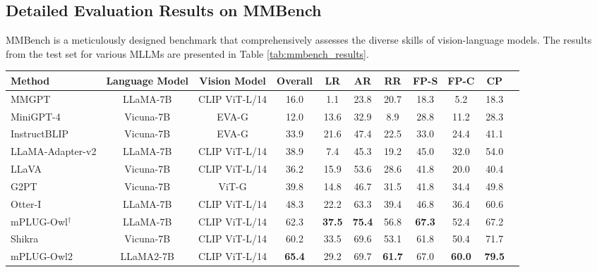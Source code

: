 \documentclass[10pt,twocolumn,letterpaper]{article}
\newcommand{\modelname}{mPLUG-Owl2\xspace}
\begin{document}
\subsection{Detailed Evaluation Results on MMBench}
MMBench \cite{liu2023mmbench} is a meticulously designed benchmark that comprehensively assesses the diverse skills of vision-language models. The results from the test set for various MLLMs are presented in Table \ref{tab:mmbench_results}.


\begin{table*}[!t]
\small
\centering
\begin{tabular}{l|cc|cccccccc}
\toprule
Method & Language Model & Vision Model & Overall & LR & AR & RR & FP-S & FP-C & CP \\
\midrule
MMGPT \cite{gong2023mmgpt} & LLaMA-7B & CLIP ViT-L/14 & 16.0 & 1.1 & 23.8 & 20.7 & 18.3 & 5.2 & 18.3 \\
MiniGPT-4 \cite{Zhu2023MiniGPT4} & Vicuna-7B & EVA-G & 12.0 & 13.6 & 32.9 & 8.9 & 28.8 & 11.2 & 28.3 \\
InstructBLIP \cite{Dai2023InstructBLIP} & Vicuna-7B & EVA-G & 33.9 & 21.6 & 47.4 & 22.5 & 33.0 & 24.4 & 41.1 \\
LLaMA-Adapter-v2 \cite{Gao2023LLaMAAdapterV2} & LLaMA-7B & CLIP ViT-L/14 & 38.9 & 7.4 & 45.3 & 19.2 & 45.0 & 32.0 & 54.0 \\
LLaVA \cite{Sun2023LLavaRlhf} & Vicuna-7B & CLIP ViT-L/14 & 36.2 & 15.9 & 53.6 & 28.6 & 41.8 & 20.0 & 40.4 \\
G2PT \cite{liu2023mmbench} & Vicuna-7B & ViT-G & 39.8 & 14.8 & 46.7 & 31.5 & 41.8 & 34.4 & 49.8 \\
Otter-I \cite{Li2023Otter} & LLaMA-7B & CLIP ViT-L/14 & 48.3 & 22.2 & 63.3 & 39.4 & 46.8 & 36.4 & 60.6 \\
mPLUG-Owl$^\dag$ \cite{ye2023mplugowl} & LLaMA-7B & CLIP ViT-L/14 & 62.3 & \textbf{37.5} & \textbf{75.4} & 56.8 & \textbf{67.3} & 52.4 & 67.2 \\
Shikra \cite{Chen2023Shikra} & Vicuna-7B & CLIP ViT-L/14 & 60.2 & 33.5 & 69.6 & 53.1 & 61.8 & 50.4 & 71.7 \\
\midrule 
\modelname & LLaMA2-7B & CLIP ViT-L/14 & \textbf{65.4} & 29.2 & 69.7 & \textbf{61.7} & 67.0 & \textbf{60.0} & \textbf{79.5} \\
\bottomrule
\end{tabular}\caption{CircularEval multi-choice accuracy results on MMBench \cite{liu2023mmbench} dev set. We adopt the following
abbreviations: LR for Logical Reasoning; AR for Attribute Reasoning; RR for Relation Reasoning; FP-C for Fine-grained Perception (Cross Instance); FP-S for Fine-grained Perception (Single Instance); CP for Coarse Perception. Baseline results are taken from \cite{liu2023mmbench}. $^\dag$ denotes the model is carefully optimized for MMBench.}
\label{tab:mmbench_results}
\end{table*}
\end{document}
